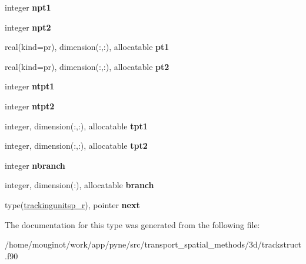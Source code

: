 \begin{DoxyCompactItemize}
integer {\bfseries npt1}
\item 
\mbox{\label{structtracking__data__structures_1_1trackingunitsp__r_a62bea582cc9a5d9dec850abc3b452fbe}} 
integer {\bfseries npt2}
\item 
\mbox{\label{structtracking__data__structures_1_1trackingunitsp__r_ac614c75b8fa2a81192247a44a2b584c6}} 
real(kind=pr), dimension(\+:,\+:), allocatable {\bfseries pt1}
\item 
\mbox{\label{structtracking__data__structures_1_1trackingunitsp__r_a00c9e7fc4488d6958a95972d296cc894}} 
real(kind=pr), dimension(\+:,\+:), allocatable {\bfseries pt2}
\item 
\mbox{\label{structtracking__data__structures_1_1trackingunitsp__r_a14fdecc3b9fc9435df875be0cb333fbf}} 
integer {\bfseries ntpt1}
\item 
\mbox{\label{structtracking__data__structures_1_1trackingunitsp__r_addca6922d607a25212231366455f182a}} 
integer {\bfseries ntpt2}
\item 
\mbox{\label{structtracking__data__structures_1_1trackingunitsp__r_a8ab324b5f7b70fa24e02a9ad0df7b8a2}} 
integer, dimension(\+:,\+:), allocatable {\bfseries tpt1}
\item 
\mbox{\label{structtracking__data__structures_1_1trackingunitsp__r_a48b98539d1463bca054ab2c835aa578e}} 
integer, dimension(\+:,\+:), allocatable {\bfseries tpt2}
\item 
\mbox{\label{structtracking__data__structures_1_1trackingunitsp__r_a5378c801096551d6d507eb04dd011a6c}} 
integer {\bfseries nbranch}
\item 
\mbox{\label{structtracking__data__structures_1_1trackingunitsp__r_a190f4625d2f13828b2f02ca184121c79}} 
integer, dimension(\+:), allocatable {\bfseries branch}
\item 
\mbox{\label{structtracking__data__structures_1_1trackingunitsp__r_a24d8fb2d7521637baa6381200f4fd753}} 
type(\hyperlink{structtracking__data__structures_1_1trackingunitsp__r}{trackingunitsp\+\_\+r}), pointer {\bfseries next}
\end{DoxyCompactItemize}


The documentation for this type was generated from the following file\+:\begin{DoxyCompactItemize}
\item 
/home/mouginot/work/app/pyne/src/transport\+\_\+spatial\+\_\+methods/3d/trackstruct.\+f90\end{DoxyCompactItemize}
